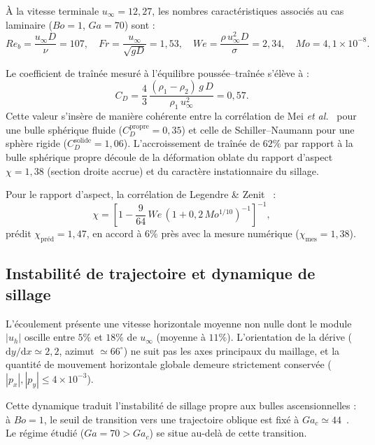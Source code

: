 À la vitesse terminale $u_\infty = 12{,}27$, les nombres caractéristiques associés au cas laminaire ($Bo=1$, $Ga=70$) sont :
\begin{equation}
    Re_b = \frac{u_\infty D}{\nu} = 107, \quad
    Fr = \frac{u_\infty}{\sqrt{gD}} = 1{,}53, \quad
    We = \frac{\rho\,u_\infty^2 D}{\sigma} = 2{,}34, \quad
    Mo = 4{,}1\times10^{-8}.
\end{equation}

Le coefficient de traînée mesuré à l'équilibre poussée--traînée s'élève à :
\begin{equation}
    C_D = \frac{4}{3}\,\frac{(\rho_1-\rho_2)\,g\,D}{\rho_1\,u_\infty^2} = 0{,}57.
\end{equation}
Cette valeur s'insère de manière cohérente entre la corrélation de Mei \emph{et al.}~\cite{mei1994} pour une bulle sphérique fluide ($C_D^{\text{propre}} = 0{,}35$) et celle de Schiller--Naumann pour une sphère rigide ($C_D^{\text{solide}} = 1{,}06$). L'accroissement de traînée de $62\%$ par rapport à la bulle sphérique propre découle de la déformation oblate du rapport d'aspect $\chi = 1{,}38$ (section droite accrue) et du caractère instationnaire du sillage.

Pour le rapport d'aspect, la corrélation de Legendre \& Zenit~\cite{legendre2025} :
\begin{equation}
    \chi = \left[1 - \frac{9}{64}\,We\,\left(1+0{,}2\,Mo^{1/10}\right)^{-1}\right]^{-1},
\end{equation}
prédit $\chi_{\text{préd}} = 1{,}47$, en accord à $6\%$ près avec la mesure numérique ($\chi_{\text{mes}} = 1{,}38$).


\subsection{Instabilité de trajectoire et dynamique de sillage}

L'écoulement présente une vitesse horizontale moyenne non nulle dont le module $|u_h|$ oscille entre $5\%$ et $18\%$ de $u_\infty$ (moyenne à $11\%$). L'orientation de la dérive ($\mathrm{d}y/\mathrm{d}x \simeq 2{,}2$, azimut $\simeq 66^\circ$) ne suit pas les axes principaux du maillage, et la quantité de mouvement horizontale globale demeure strictement conservée ($|p_x|, |p_y| \le 4\times10^{-3}$).

Cette dynamique traduit l'instabilité de sillage propre aux bulles ascensionnelles : à $Bo=1$, le seuil de transition vers une trajectoire oblique est fixé à $Ga_c \simeq 44$~\cite{canolozano2016}. Le régime étudié ($Ga=70 > Ga_c$) se situe au-delà de cette transition.

